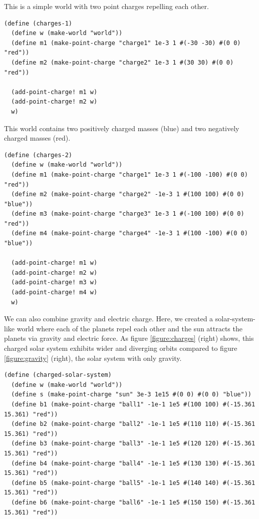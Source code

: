 \documentclass{article}
\begin{document}

This is a simple world with two point charges repelling each other.

{\small\begin{verbatim}
(define (charges-1)
  (define w (make-world "world"))
  (define m1 (make-point-charge "charge1" 1e-3 1 #(-30 -30) #(0 0) "red"))
  (define m2 (make-point-charge "charge2" 1e-3 1 #(30 30) #(0 0) "red"))

  (add-point-charge! m1 w)
  (add-point-charge! m2 w)
  w)
\end{verbatim}}


This world contains two positively charged masses (blue) and two negatively
charged masses (red).

{\small\begin{verbatim}
(define (charges-2)
  (define w (make-world "world"))
  (define m1 (make-point-charge "charge1" 1e-3 1 #(-100 -100) #(0 0) "red"))
  (define m2 (make-point-charge "charge2" -1e-3 1 #(100 100) #(0 0) "blue"))
  (define m3 (make-point-charge "charge3" 1e-3 1 #(-100 100) #(0 0) "red"))
  (define m4 (make-point-charge "charge4" -1e-3 1 #(100 -100) #(0 0) "blue"))

  (add-point-charge! m1 w)
  (add-point-charge! m2 w)
  (add-point-charge! m3 w)
  (add-point-charge! m4 w)
  w)
\end{verbatim}}


We can also combine gravity and electric charge. Here, we created a
    solar-system-like world where each of the planets repel each other and the
    sun attracts the planets via gravity and electric force. As figure
    \ref{figure:charges} (right) shows, this charged solar system exhibits
    wider and diverging orbits compared to figure \ref{figure:gravity} (right),
    the solar system with only gravity.

{\small\begin{verbatim}
(define (charged-solar-system)
  (define w (make-world "world"))
  (define s (make-point-charge "sun" 3e-3 1e15 #(0 0) #(0 0) "blue"))
  (define b1 (make-point-charge "ball1" -1e-1 1e5 #(100 100) #(-15.361 15.361) "red"))
  (define b2 (make-point-charge "ball2" -1e-1 1e5 #(110 110) #(-15.361 15.361) "red"))
  (define b3 (make-point-charge "ball3" -1e-1 1e5 #(120 120) #(-15.361 15.361) "red"))
  (define b4 (make-point-charge "ball4" -1e-1 1e5 #(130 130) #(-15.361 15.361) "red"))
  (define b5 (make-point-charge "ball5" -1e-1 1e5 #(140 140) #(-15.361 15.361) "red"))
  (define b6 (make-point-charge "ball6" -1e-1 1e5 #(150 150) #(-15.361 15.361) "red"))

\end{verbatim}}
\end{document}
